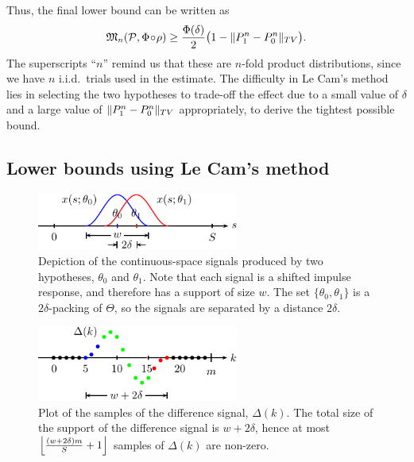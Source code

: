 \documentclass[conference,letterpaper]{IEEEtran}
\DeclarePairedDelimiter\norm{\lVert}{\rVert}
\DeclarePairedDelimiter\floor{\lfloor}{\rfloor}
\newcommand{\Phiorho}{\Phi\!\circ\!\rho}
\begin{document}
Thus, the final lower bound can be written as
\begin{equation} \label{eq:le-cam-bound}
	\mathfrak{M}_n(\mathcal P, \Phiorho) \geq \frac{\Phi(\delta)}{2} \big(1 - \norm{P_1^n - P_0^n}_{TV}\big).
\end{equation}
The superscripts ``$n$'' remind us that these are $n$-fold product
distributions, since we have $n$ i.i.d.\ trials used in the estimate.  The
difficulty in Le Cam's method lies in selecting the two hypotheses to trade-off
the effect due to a small value of $\delta$ and a large value of $\norm{P_1^n -
P_0^n}_{TV}$ appropriately, to derive the tightest possible bound.

\subsection{Lower bounds using Le Cam's method}
\label{sec:lecam-lb}

\begin{figure}[t]
	\centering
	\includegraphics[width=2.6in]{overlap-middle-pics}
	\caption{Depiction of the continuous-space signals produced by two
		hypotheses, $\theta_0$ and $\theta_1$. Note that each signal is a
		shifted impulse response, and therefore has a support of size $w$.
		The set $\{\theta_0, \theta_1\}$ is a $2\delta$-packing of
		$\Theta$, so the signals are separated by a distance $2\delta$.}
	\label{fig:overlap-middle}
\end{figure}
\begin{figure}[t]
	\centering
	\includegraphics[width=2.6in]{delta-sampled-pics}
	\caption{Plot of the samples of the difference signal, $\Delta(k)$. The
		total size of the support of the difference signal is $w+2\delta$,
		hence at most $\floor*{\frac{(w + 2\delta)m}{S} + 1}$ samples of
		$\Delta(k)$ are non-zero.}
	\label{fig:delta-sampled}
\end{figure}
\end{document}
